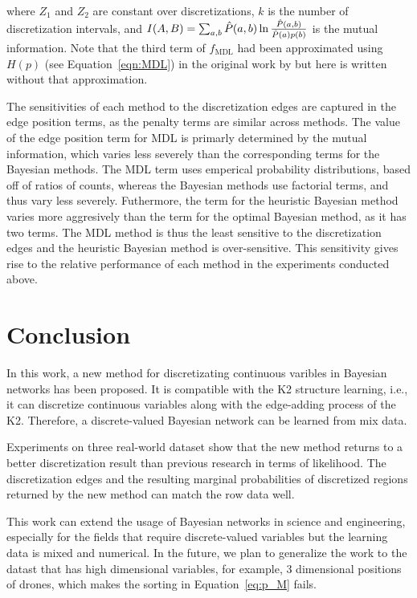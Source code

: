 \noindent
where $Z_1$ and $Z_2$ are constant over discretizations, $k$ is the number of discretization intervals, and $I\paren{A, B} = \sum_{a,b} \hat{P}(a,b) \ln\frac{\hat{P}(a,b)}{\hat{P}(a)p(b)}$ is the mutual information.
Note that the third term of $f_\text{MDL}$ had been approximated using $H(p)$ (see Equation~\ref{eqn:MDL}) in the original work by \cite{Friedman_1996} but here is written without that approximation.

The sensitivities of each method to the discretization edges are captured in the edge position terms, as the penalty terms are similar across methods.
The value of the edge position term for MDL is primarly determined by the mutual information, which varies less severely than the corresponding terms for the Bayesian methods.
The MDL term uses emperical probability distributions, based off of ratios of counts, whereas the Bayesian methods use factorial terms, and thus vary less severely.
Futhermore, the term for the heuristic Bayesian method varies more aggresively than the term for the optimal Bayesian method, as it has two terms.
The MDL method is thus the least sensitive to the discretization edges and the heuristic Bayesian method is over-sensitive.
This sensitivity gives rise to the relative performance of each method in the experiments conducted above.

\section{Conclusion}
In this work, a new method for discretizating continuous varibles in Bayesian networks has been proposed. It is compatible with the K2 structure learning, i.e., it can discretize continuous variables along with the edge-adding process of the K2. Therefore, a discrete-valued Bayesian network can be learned from mix data.

Experiments on three real-world dataset show that the new method returns to a better discretization result than previous research in terms of likelihood. The discretization edges and the resulting marginal probabilities of discretized regions returned by the new method can match the row data well.

This work can extend the usage of Bayesian networks in science and engineering, especially for the fields that require discrete-valued variables but the learning data is mixed and numerical. In the future, we plan to generalize the work to the datast that has high dimensional variables, for example, 3 dimensional positions of drones, which makes the sorting in Equation~\ref{eq:p_M} fails.

